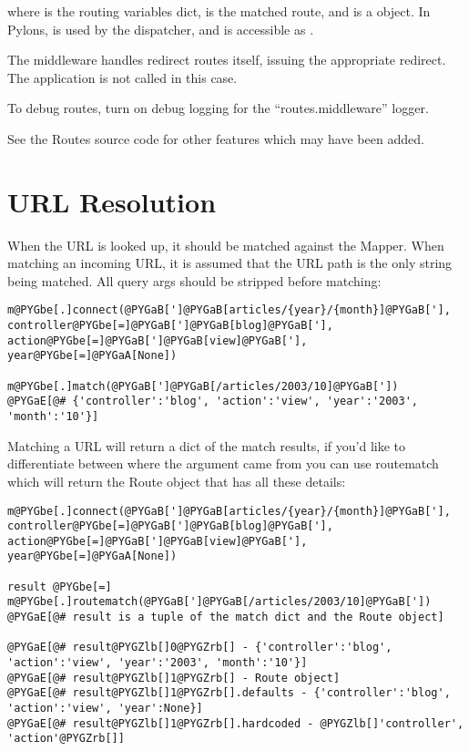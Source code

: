 \documentclass[letterpaper,10pt,english]{manual}
\begin{document}
where  is the routing variables dict,  is the matched route,
and  is a  object.  In Pylons,  is used by the
dispatcher, and  is accessible as .

The middleware handles redirect routes itself, issuing the appropriate
redirect.  The application is not called in this case.

To debug routes, turn on debug logging for the ``routes.middleware'' logger.

See the Routes source code for other features which may have been added.


\section{URL Resolution}

When the URL is looked up, it should be matched against the Mapper. When
matching an incoming URL, it is assumed that the URL path is the only string
being matched. All query args should be stripped before matching:

\begin{Verbatim}[commandchars=@\[\]]
m@PYGbe[.]connect(@PYGaB[']@PYGaB[articles/{year}/{month}]@PYGaB['], controller@PYGbe[=]@PYGaB[']@PYGaB[blog]@PYGaB['], action@PYGbe[=]@PYGaB[']@PYGaB[view]@PYGaB['], year@PYGbe[=]@PYGaA[None])

m@PYGbe[.]match(@PYGaB[']@PYGaB[/articles/2003/10]@PYGaB['])
@PYGaE[@# {'controller':'blog', 'action':'view', 'year':'2003', 'month':'10'}]
\end{Verbatim}

Matching a URL will return a dict of the match results, if you'd like to
differentiate between where the argument came from you can use routematch which
will return the Route object that has all these details:

\begin{Verbatim}[commandchars=@\[\]]
m@PYGbe[.]connect(@PYGaB[']@PYGaB[articles/{year}/{month}]@PYGaB['], controller@PYGbe[=]@PYGaB[']@PYGaB[blog]@PYGaB['], action@PYGbe[=]@PYGaB[']@PYGaB[view]@PYGaB['], year@PYGbe[=]@PYGaA[None])

result @PYGbe[=] m@PYGbe[.]routematch(@PYGaB[']@PYGaB[/articles/2003/10]@PYGaB['])
@PYGaE[@# result is a tuple of the match dict and the Route object]

@PYGaE[@# result@PYGZlb[]0@PYGZrb[] - {'controller':'blog', 'action':'view', 'year':'2003', 'month':'10'}]
@PYGaE[@# result@PYGZlb[]1@PYGZrb[] - Route object]
@PYGaE[@# result@PYGZlb[]1@PYGZrb[].defaults - {'controller':'blog', 'action':'view', 'year':None}]
@PYGaE[@# result@PYGZlb[]1@PYGZrb[].hardcoded - @PYGZlb[]'controller', 'action'@PYGZrb[]]
\end{Verbatim}
\end{document}
